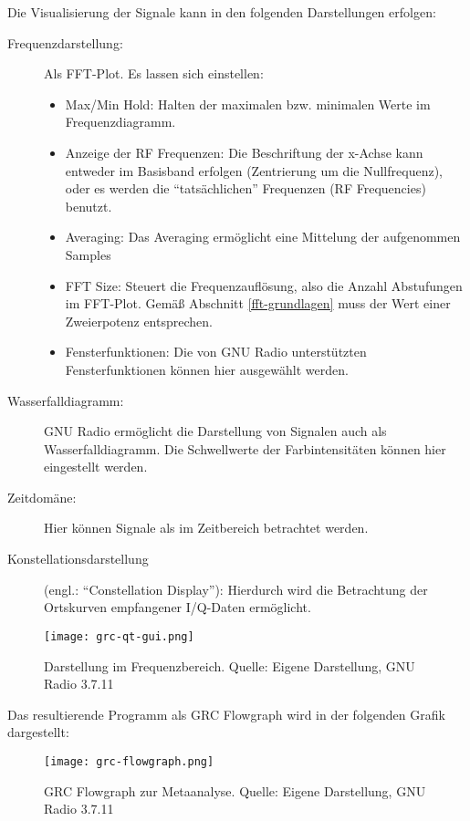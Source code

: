 Die Visualisierung der Signale kann in den folgenden Darstellungen erfolgen:
\begin{description}
	\item[Frequenzdarstellung:] Als FFT-Plot. Es lassen sich einstellen:
		\begin{itemize}
			\item Max/Min Hold: Halten der maximalen bzw. minimalen Werte im Frequenzdiagramm.
			\item Anzeige der RF Frequenzen: Die Beschriftung der x-Achse kann entweder im Basisband erfolgen (Zentrierung um die Nullfrequenz), oder es werden die \enquote{tatsächlichen} Frequenzen (RF Frequencies) benutzt.
			\item  Averaging: Das Averaging ermöglicht eine Mittelung der aufgenommen Samples
			\item FFT Size: Steuert die Frequenzauflösung, also die Anzahl Abstufungen im FFT-Plot. Gemäß Abschnitt \ref{fft-grundlagen} muss der Wert einer Zweierpotenz entsprechen.
			\item Fensterfunktionen: Die von GNU Radio unterstützten Fensterfunktionen können hier ausgewählt werden.
		\end{itemize}
	\item[Wasserfalldiagramm:] GNU Radio ermöglicht die Darstellung von Signalen auch als Wasserfalldiagramm. Die Schwellwerte der Farbintensitäten können hier eingestellt werden. 
	\item[Zeitdomäne:] Hier können Signale als im Zeitbereich betrachtet werden.
	\item[Konstellationsdarstellung] (engl.: \enquote{Constellation Display}): Hierdurch wird die Betrachtung der Ortskurven empfangener I/Q-Daten ermöglicht.
\end{description}

\begin{figure}[ht]
	\centering
	\texttt{[image: grc-qt-gui.png]}
	\caption[Darstellung im Frequenzbereich]{Darstellung im Frequenzbereich. Quelle: Eigene Darstellung, GNU Radio 3.7.11} 
	\label{grc-qt-gui}
\end{figure}



Das resultierende Programm als GRC Flowgraph wird in der folgenden Grafik dargestellt:
\begin{figure}[H]
	\centering
	\texttt{[image: grc-flowgraph.png]}
	\caption[GRC Flowgraph zur Metaanalyse]{GRC Flowgraph zur Metaanalyse. Quelle: Eigene Darstellung, GNU Radio 3.7.11} 
	\label{grc-flowgraph}
\end{figure}
